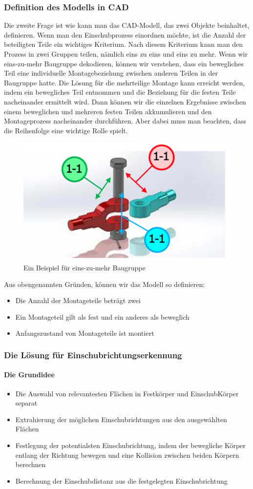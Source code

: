 \documentclass[14pt,a4paper,titlepage]{article}
\begin{document}
		\subsubsection{Definition des Modells in CAD}
		Die zweite Frage ist wie kann man das CAD-Modell, das zwei Objekte beinhaltet, definieren. Wenn man den Einschubprozess einordnen möchte, ist die Anzahl der beteiligten Teile ein wichtiges Kriterium. Nach diesem Kriterium kann man den Prozess in zwei Gruppen teilen, nämlich eins zu eins und eins zu mehr.  
		\bigbreak
		Wenn wir eins-zu-mehr Baugruppe dekodieren, können wir verstehen, dass ein bewegliches Teil eine individuelle Montagebeziehung zwischen anderen Teilen in der Baugruppe hatte. Die Lösung für die mehrteilige Montage kann erreicht werden, indem ein bewegliches Teil entnommen und die Beziehung für die festen Teile nacheinander ermittelt wird. Dann können wir die einzelnen Ergebnisse zwischen einem beweglichen und mehreren festen Teilen akkumulieren und den Montageprozess nacheinander durchführen. Aber dabei muss man beachten, dass die Reihenfolge eine wichtige Rolle spielt.\\
			\begin{figure}[h!]
			\centering
			\includegraphics[width=0.5\linewidth]{eins-zu-mehr.png}
			\caption{Ein Beispiel für eins-zu-mehr Baugruppe}
			\end{figure}
		Aus obengenannten Gründen, können wir das Modell so definieren:
			\begin{itemize}
				\item Die Anzahl der Montageteile beträgt zwei
				\item Ein Montageteil gilt als fest und ein anderes als beweglich
				\item Anfangszustand von Montageteile ist montiert
			\end{itemize}
		\subsubsection{Die Lösung für Einschubrichtungserkennung}
			\paragraph{Die Grundidee}
			\begin{itemize}
				\item Die Auswahl von relevantesten Flächen in Festkörper und EinschubKörper separat
				\item Extrahierung der möglichen Einschubrichtungen aus den ausgewählten Flächen
				\item Festlegung der potentialsten Einschubrichtung, indem der bewegliche Körper entlang der Richtung bewegen und eine Kollision zwischen beiden Körpern berechnen
				\item Berechnung der Einschubdistanz aus die festgelegten Einschubrichtung
			\end{itemize}
\end{document}
